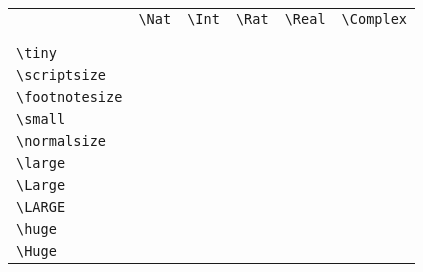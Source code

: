 \begin{center}
\begin{tabular}{l|ccccc}
&\verb|\Nat|&\verb|\Int|&\verb|\Rat|&\verb|\Real|&\verb|\Complex|\\
&&\\\hline&&\\
\verb$\tiny$		& \ENTRY{\tiny}		\\
\verb$\scriptsize$	& \ENTRY{\scriptsize}	\\
\verb$\footnotesize$	& \ENTRY{\footnotesize} \\
\verb$\small$		& \ENTRY{\small}	\\
\verb$\normalsize$	& \ENTRY{\normalsize}	\\
\verb$\large$		& \ENTRY{\large}	\\
\verb$\Large$		& \ENTRY{\Large}	\\
\verb$\LARGE$		& \ENTRY{\LARGE}	\\
\verb$\huge$		& \ENTRY{\huge}		\\
\verb$\Huge$		& \ENTRY{\Huge}
\end{tabular}\end{center}
